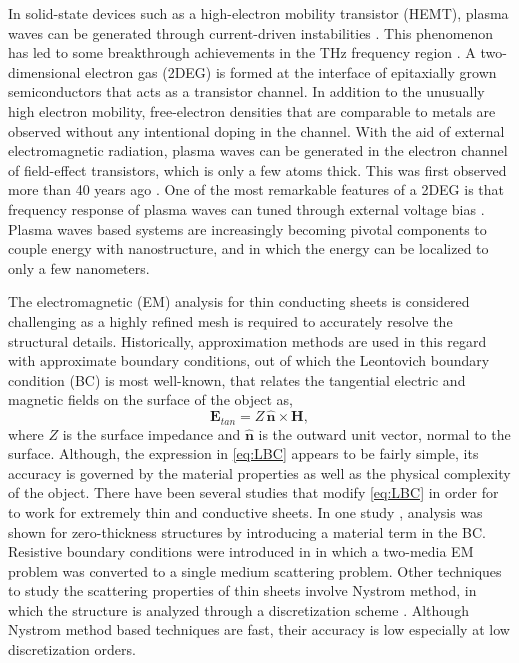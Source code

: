 \documentclass{ieeeaccess}
\renewcommand{\v}[1]{\mathbf{#1}} %
\newcommand{\x}{\times}  %
\renewcommand{\^}{\hat}  %
\begin{document}
In solid-state devices such as a high-electron mobility transistor (HEMT), plasma waves can be generated through current-driven instabilities \cite{Kempa1991}. This phenomenon has led to some breakthrough achievements in the THz frequency region \cite{Dyer2016,Wu2015,Dyakonov1993,Dyakonov1996,Popov2005,Otsuji2006,Dyakonov2005}. A two-dimensional electron gas (2DEG) is formed at the interface of epitaxially grown semiconductors that acts as a transistor channel. In addition to the unusually high electron mobility, free-electron densities that are comparable to metals are observed without any intentional doping in the channel. With the aid of external electromagnetic radiation, plasma waves can be generated in the electron channel of field-effect transistors, which is only a few atoms thick. This was first observed more than 40 years ago \cite{Stern1967a, Allen1977}. One of the most remarkable features of a 2DEG is that frequency response of plasma waves can tuned through external voltage bias \cite{Fatimy2010, Rabbaa2011}. Plasma waves based systems are increasingly becoming pivotal components to couple energy with nanostructure, and in which the energy can be localized to only a few nanometers.

The electromagnetic (EM) analysis for thin conducting sheets is considered challenging as a highly refined mesh is required to accurately resolve the structural details. Historically, approximation methods are used in this regard with approximate boundary conditions, out of which the Leontovich boundary condition (BC) \cite{Senior1995,Hoppe1995} is most well-known, that relates the tangential electric and magnetic fields on the surface of the object as,
%
\begin{equation}
  \v E_{tan} = Z \, \^{\v{n}} \x \v H,
  \label{eq:LBC}
\end{equation} 
% 
where $Z$ is the surface impedance and $\v{\^{n}}$ is the outward unit vector, normal to the surface. Although, the expression in \eqref{eq:LBC} appears to be fairly simple, its accuracy is governed by the material properties as well as the physical complexity of the object. There have been several studies that modify \eqref{eq:LBC} in order for to work for extremely thin and conductive sheets. In one study \cite{Karlsson}, analysis was shown for zero-thickness structures by introducing a material term in the BC. Resistive boundary conditions were introduced in \cite{senior1979backscattering} in which a two-media EM problem was converted to a single medium scattering problem. Other techniques to study the scattering properties of thin sheets involve Nystrom method, in which the structure is analyzed through a discretization scheme \cite{Olga}. Although Nystrom method based techniques are fast, their accuracy is low especially at low discretization orders. 
\end{document}
